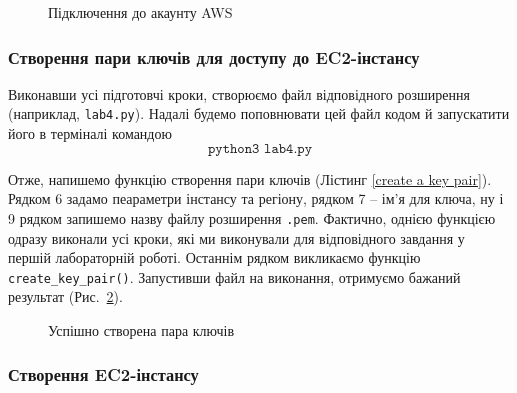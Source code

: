 \documentclass[a4paper,14pt]{extarticle} %
\begin{document}
\begin{figure}[H]
    \caption{Підключення до акаунту AWS}
    \label{fig:EC2:connecting to aws}
\end{figure}

\subsubsection*{Створення пари ключів для доступу до EC2-інстансу}

Виконавши усі підготовчі кроки, створюємо файл відповідного розширення (наприклад, \texttt{lab4.py}). Надалі 
будемо поповнювати цей файл кодом й запускатити його в терміналі командою
\[ \texttt{python3 lab4.py} \]

Отже, напишемо функцію створення пари ключів (Лістинг \ref{create a key pair}). Рядком 6 задамо пеараметри інстансу 
та регіону, рядком 7 -- ім'я для ключа, ну і 9 рядком запишемо назву файлу розширення \texttt{.pem}. Фактично, однією 
функцією одразу виконали усі кроки, які ми виконували для відповідного завдання у першій лабораторній роботі. 
Останнім рядком викликаємо функцію \texttt{create\_key\_pair()}. Запустивши файл на виконання, отримуємо бажаний 
результат (Рис.~\ref{fig:EC2:creating key pair}).



\begin{figure}[H]
    \caption{Успішно створена пара ключів}
    \label{fig:EC2:creating key pair}
\end{figure}

\subsubsection*{Створення EC2-інстансу}
\end{document}
